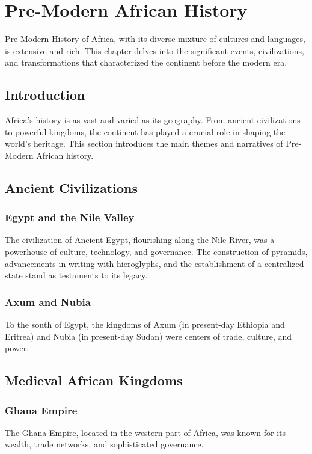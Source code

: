 \documentclass{book}
\begin{document}
\chapter{Pre-Modern African History}
\label{ch:pre-modern-african-history}

Pre-Modern History of Africa, with its diverse mixture of cultures and languages, is extensive and rich. This chapter delves into the significant events, civilizations, and transformations that characterized the continent before the modern era.

\section{Introduction}
\label{sec:introduction-pre-modern-africa}

Africa’s history is as vast and varied as its geography. From ancient civilizations to powerful kingdoms, the continent has played a crucial role in shaping the world’s heritage. This section introduces the main themes and narratives of Pre-Modern African history.

\section{Ancient Civilizations}
\label{sec:ancient-civilizations}

\subsection{Egypt and the Nile Valley}
The civilization of Ancient Egypt, flourishing along the Nile River, was a powerhouse of culture, technology, and governance. The construction of pyramids, advancements in writing with hieroglyphs, and the establishment of a centralized state stand as testaments to its legacy.

\subsection{Axum and Nubia}
To the south of Egypt, the kingdoms of Axum (in present-day Ethiopia and Eritrea) and Nubia (in present-day Sudan) were centers of trade, culture, and power.

\section{Medieval African Kingdoms}
\label{sec:medieval-african-kingdoms}

\subsection{Ghana Empire}
The Ghana Empire, located in the western part of Africa, was known for its wealth, trade networks, and sophisticated governance.
\end{document}

